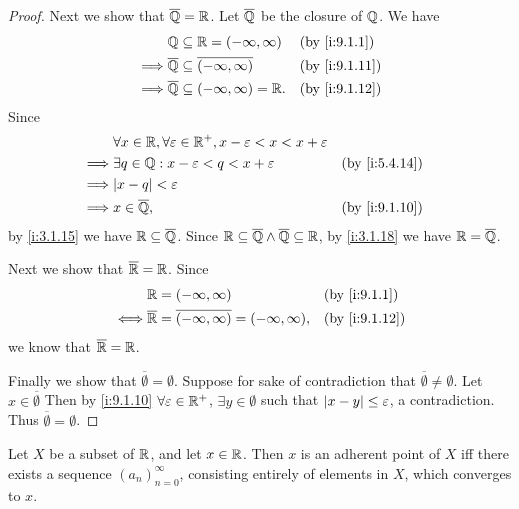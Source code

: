 \begin{proof}
  Next we show that \(\overline{\mathbb{Q}} = \mathbb{R}\).
  Let \(\overline{\mathbb{Q}}\) be the closure of \(\mathbb{Q}\).
  We have
  \begin{align*}
             & \Q \subseteq \R = (-\infty, \infty)                  &  & \by{i:9.1.1}  \\
    \implies & \overline{\Q} \subseteq \overline{(-\infty, \infty)} &  & \by{i:9.1.11} \\
    \implies & \overline{\Q} \subseteq (-\infty, \infty) = \R.      &  & \by{i:9.1.12}
  \end{align*}
  Since
  \begin{align*}
             & \forall x \in \R, \forall \varepsilon \in \R^+, x - \varepsilon < x < x + \varepsilon                    \\
    \implies & \exists q \in \Q : x - \varepsilon < q < x + \varepsilon                              &  & \by{i:5.4.14} \\
    \implies & \abs{x - q} < \varepsilon                                                                                \\
    \implies & x \in \overline{\Q},                                                                  &  & \by{i:9.1.10}
  \end{align*}
  by \cref{i:3.1.15} we have \(\mathbb{R} \subseteq \overline{\mathbb{Q}}\).
  Since \(\mathbb{R} \subseteq \overline{\mathbb{Q}} \land \overline{\mathbb{Q}} \subseteq \mathbb{R}\), by \cref{i:3.1.18} we have \(\mathbb{R} = \overline{\mathbb{Q}}\).

  Next we show that \(\overline{\mathbb{R}} = \mathbb{R}\).
  Since
  \begin{align*}
         & \R = (-\infty, \infty)                                            &  & \by{i:9.1.1}  \\
    \iff & \overline{\R} = \overline{(-\infty, \infty)} = (-\infty, \infty), &  & \by{i:9.1.12}
  \end{align*}
  we know that \(\overline{\mathbb{R}} = \mathbb{R}\).

  Finally we show that \(\overline{\emptyset} = \emptyset\).
  Suppose for sake of contradiction that \(\overline{\emptyset} \neq \emptyset\).
  Let \(x \in \overline{\emptyset}\)
  Then by \cref{i:9.1.10} \(\forall \varepsilon \in \mathbb{R}^+\), \(\exists y \in \emptyset\) such that \(\left\lvert x - y\right\rvert \leq \varepsilon\), a contradiction.
  Thus \(\overline{\emptyset} = \emptyset\).
\end{proof}

\begin{lem}\label{i:9.1.14}
  Let \(X\) be a subset of \(\mathbb{R}\), and let \(x \in \mathbb{R}\).
  Then \(x\) is an adherent point of \(X\) iff there exists a sequence \((a_n)_{n = 0}^\infty\), consisting entirely of elements in \(X\), which converges to \(x\).
\end{lem}

